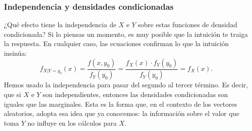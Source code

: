 \subsubsection{Independencia y densidades condicionadas}

¿Qué efecto tiene la independencia de $X$ e $Y$ sobre estas funciones de densidad condicionada? Si lo piensas un momento, es muy posible que la intuición te traiga la respuesta. En cualquier caso, las ecuaciones confirman lo que la intuición insinúa:
\[
f_{X|Y=y_0}(x)=\dfrac{f(x,y_0)}{f_Y(y_0)}=\dfrac{f_X(x)\cdot f_Y(y_0)}{f_Y(y_0)}=f_X(x).
\]
Hemos usado la independencia para pasar del segundo al tercer término. Es decir, que si $X$ e $Y$ son independientes, entonces las densidades condicionadas son iguales que las marginales. Esta es la forma que, en el contexto de los vectores aleatorios, adopta esa idea que ya conocemos: la información sobre el valor que toma $Y$ no influye en los cálculos para $X$.

